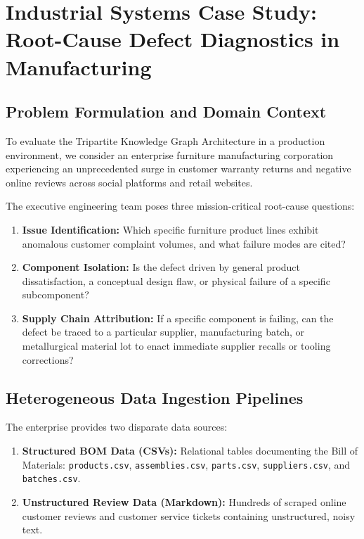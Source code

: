 \documentclass[10pt,twocolumn,letterpaper]{article}
\begin{document}
\section{Industrial Systems Case Study: Root-Cause Defect Diagnostics in Manufacturing}
\label{sec:case_study}

\subsection{Problem Formulation and Domain Context}
To evaluate the Tripartite Knowledge Graph Architecture in a production environment, we consider an enterprise furniture manufacturing corporation experiencing an unprecedented surge in customer warranty returns and negative online reviews across social platforms and retail websites.

The executive engineering team poses three mission-critical root-cause questions:
\begin{enumerate}
    \item \textbf{Issue Identification:} Which specific furniture product lines exhibit anomalous customer complaint volumes, and what failure modes are cited?
    \item \textbf{Component Isolation:} Is the defect driven by general product dissatisfaction, a conceptual design flaw, or physical failure of a specific subcomponent?
    \item \textbf{Supply Chain Attribution:} If a specific component is failing, can the defect be traced to a particular supplier, manufacturing batch, or metallurgical material lot to enact immediate supplier recalls or tooling corrections?
\end{enumerate}

\subsection{Heterogeneous Data Ingestion Pipelines}
The enterprise provides two disparate data sources:
\begin{enumerate}
    \item \textbf{Structured BOM Data (CSVs):} Relational tables documenting the Bill of Materials: \texttt{products.csv}, \texttt{assemblies.csv}, \texttt{parts.csv}, \texttt{suppliers.csv}, and \texttt{batches.csv}.
    \item \textbf{Unstructured Review Data (Markdown):} Hundreds of scraped online customer reviews and customer service tickets containing unstructured, noisy text.
\end{enumerate}
\end{document}
